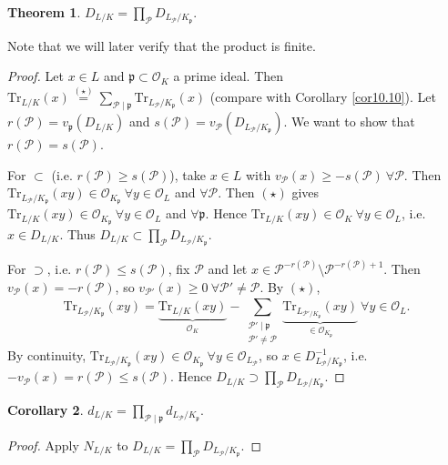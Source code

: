 \documentclass{article}
\theoremstyle{definition}
\newtheorem{theorem}{Theorem}[section]
\newtheorem{cor}[theorem]{Corollary}
\begin{document}
\begin{theorem}\label{theorem12.7}
    $D_{L/K} = \prod_{\mathcal{P}}^{} D_{L_\mathcal{P}/K_\mathfrak{p}}$. 
\end{theorem}
Note that we will later verify that the product is finite.
\begin{proof}
    Let $x \in L$ and $\mathfrak{p} \subset \mathcal{O}_K$ a prime ideal. Then $\text{Tr}_{L/K}(x) \stackrel{(\star)}{=} \sum_{\mathcal{P}\mid  \mathfrak{p}}^{} \text{Tr}_{L_\mathcal{P}/K_\mathfrak{p}}(x)$ (compare with Corollary \ref{cor10.10}). Let $r(\mathcal{P}) = v_{\mathfrak{p}}(D_{L/K})$ and $s(\mathcal{P}) = v_{\mathcal{P}}(D_{L_\mathcal{P}/K_\mathfrak{p}})$. We want to show that $r(\mathcal{P}) = s(\mathcal{P})$. 
    \vspace{1mm}
     
    For $\subset$ (i.e. $r(\mathcal{P})\ge s(\mathcal{P})$), take $x \in L$ with $v_{\mathcal{P}}(x) \ge -s(\mathcal{P}) ~\forall \mathcal{P}$. Then $\text{Tr}_{L_\mathcal{P}/K_\mathfrak{p}}(xy) \in \mathcal{O}_{K_\mathfrak{p}} ~\forall y \in \mathcal{O}_L$ and $\forall \mathcal{P}$. Then $(\star)$ gives $\text{Tr}_{L/K}(xy) \in \mathcal{O}_{K_\mathfrak{p}} ~\forall y \in \mathcal{O}_L$ and $\forall \mathfrak{p}$. Hence $\text{Tr}_{L/K}(xy) \in \mathcal{O}_K ~\forall y \in \mathcal{O}_L$, i.e. $x \in D_{L/K}$. Thus $D_{L/K} \subset \prod_{\mathcal{P}}^{} D_{L_\mathcal{P}/K_\mathfrak{p}}$.
    \vspace{1mm}
     
    For $\supset$, i.e. $r(\mathcal{P})\le s(\mathcal{P})$, fix $\mathcal{P}$ and let $x \in \mathcal{P}^{-r(\mathcal{P})}\setminus \mathcal{P}^{-r(\mathcal{P})+1}$. Then $v_{\mathcal{P}}(x) = -r(\mathcal{P})$, so $v_{\mathcal{P}'}(x) \ge 0 ~\forall \mathcal{P}' \neq \mathcal{P}$. By $(\star)$, $$\text{Tr}_{L_\mathcal{P}/K_{\mathfrak{p}}}(xy) = \underbrace{\text{Tr}_{L/K}(xy)}_{\mathcal{O}_K} - \sum_{\substack{\mathcal{P}' \mid \mathfrak{p}\\\mathcal{P}'\neq\mathcal{P}}}^{} \underbrace{\text{Tr}_{L_{\mathcal{P}'/K_\mathfrak{p}}}(xy)}_{\in \mathcal{O}_{K_\mathfrak{p}}} ~\forall y \in \mathcal{O}_L.$$
    By continuity, $\text{Tr}_{L_\mathcal{P}/K_\mathfrak{p}}(xy) \in \mathcal{O}_{K_\mathfrak{p}} ~\forall y \in \mathcal{O}_{L_\mathcal{P}}$, so $x \in D^{-1}_{L_\mathcal{P}/K_\mathfrak{p}}$, i.e. $-v_{\mathcal{P}}(x) = r(\mathcal{P}) \le s(\mathcal{P})$. Hence $D_{L/K} \supset \prod_{\mathcal{P}}^{} D_{L_\mathcal{P}/K_\mathfrak{p}}$. 
\end{proof}
\begin{cor}
    $d_{L/K} = \prod_{\mathcal{P}\mid \mathfrak{p}}^{} d_{L_\mathcal{P}/K_\mathfrak{p}}$.
\end{cor}
\begin{proof}
    Apply $N_{L/K}$ to $D_{L/K} = \prod_{\mathcal{P}}^{} D_{L_\mathcal{P}/K_{\mathfrak{p}}}$.
\end{proof}
\end{document}
